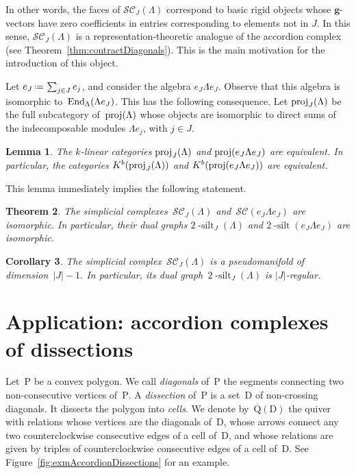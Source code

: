 \documentclass{compositio}
\newtheorem{theorem}{Theorem}%
\newtheorem{corollary}[theorem]{Corollary}
\newtheorem{lemma}[theorem]{Lemma}
\theoremstyle{definition}
\renewcommand{\b}[1]{\mathbf{#1}} %
\newcommand{\eqdef}{\mbox{\,\raisebox{0.2ex}{\scriptsize\ensuremath{\mathrm:}}\ensuremath{=}\,}} %
\newcommand{\fref}[1]{Figure~\ref{#1}} %
\newcommand{\darkblue}{\color{darkblue}} %
\newcommand{\defn}[1]{\textsl{\darkblue #1}} %
\newcommand{\polygon}{\mathrm{P}} %
\newcommand{\dissection}{\mathrm{D}} %
\newcommand{\quiver}{\mathrm{Q}} %
\newcommand{\silt}{2 \! \operatorname{-silt}}
\newcommand{\siltingComplex}{\mathcal{SC}}
\newcommand{\proj}{\operatorname{{\rm proj }}}
\newcommand{\End}[1]{\operatorname{\rm End}_{#1}}
\begin{document}
In other words, the faces of $\siltingComplex_J(\Lambda)$ correspond to basic rigid objects whose $\b{g}$-vectors have zero coefficients in entries corresponding to elements not in $J$.
In this sense, $\siltingComplex_J(\Lambda)$ is a representation-theoretic analogue of the accordion complex~\cite{Chapoton-quadrangulations, GarverMcConville, MannevillePilaud-accordion} (see Theorem~\ref{thm:contractDiagonals}).
This is the main motivation for the introduction of this object.

Let $e_J \eqdef \sum_{j\in J} e_j$, and consider the algebra $e_J \Lambda e_J$.  
Observe that this algebra is isomorphic to~$\End{\Lambda}(\Lambda e_J)$.
This has the following consequence.
Let $\proj_J(\Lambda)$ be the full subcategory of~$\proj(\Lambda)$ whose objects are isomorphic to direct sums of
the indecomposable modules $\Lambda e_j$, with $j\in J$.

\begin{lemma}
 The $k$-linear categories $\proj_J(\Lambda)$ and $\proj(e_J\Lambda e_J)$ are equivalent.
 In particular, the categories $K^b(\proj_J(\Lambda))$ and $K^b(\proj(e_J \Lambda e_J))$ are equivalent.
\end{lemma}

This lemma immediately implies the following statement.

\begin{theorem}
The simplicial complexes~$\siltingComplex_J(\Lambda)$ and~$\siltingComplex(e_J \Lambda e_J)$ are isomorphic.
In particular, their dual graphs $\silt_J(\Lambda)$ and $\silt(e_J \Lambda e_J)$ are isomorphic.
\end{theorem}

\begin{corollary}
The simplicial complex~$\siltingComplex_J(\Lambda)$ is a pseudomanifold of dimension~$|J|-1$. In particular, its dual graph~$\silt_J(\Lambda)$ is $|J|$-regular.
\end{corollary}


\section{Application: accordion complexes of dissections}
\label{sec:accordions}

Let~$\polygon$ be a convex polygon.
We call \defn{diagonals} of~$\polygon$ the segments connecting two non-consecutive vertices of~$\polygon$.
A \defn{dissection} of~$\polygon$ is a set~$\dissection$ of non-crossing diagonals.
It dissects the polygon into \defn{cells}.
We denote by~$\overline{\quiver}(\dissection)$ the quiver with relations whose vertices are the diagonals of~$\dissection$, whose arrows connect any two counterclockwise consecutive edges of a cell of~$\dissection$, and whose relations are given by triples of counterclockwise consecutive edges of a cell of~$\dissection$.
See \fref{fig:exmAccordionDissections} for an example.
\end{document}
